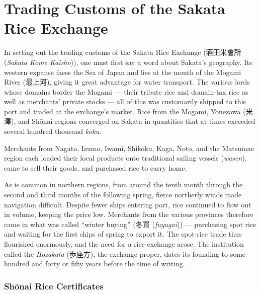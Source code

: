 \documentclass[10pt, openany]{book}
\newcommand{\jp}[1]{{\japanesefont #1}}
\newcommand{\jt}[2]{\jp{#1} (\textit{#2})}
\begin{document}
\chapter{Trading Customs of the Sakata Rice Exchange}

In setting out the trading customs of the Sakata Rice Exchange
(\jt{酒田米會所}{Sakata Kome Kaisho}), one must first say a word about
Sakata's geography. Its western expanse faces the Sea of Japan and lies
at the mouth of the Mogami River (\jp{最上河}), giving it great
advantage for water transport. The various lords whose domains border the
Mogami --- their tribute rice and domain-tax rice as well as merchants'
private stocks --- all of this was customarily shipped to this port and
traded at the exchange's market. Rice from the Mogami, Yonezawa
(\jp{米澤}), and Sh\=onai regions converged on Sakata in quantities
that at times exceeded several hundred thousand \textit{koku}.

Merchants from Nagato, Izumo, Iwami, Shikoku, Kaga, Noto, and the
Matsumae region each loaded their local products onto traditional sailing
vessels (\textit{wasen}), came to sell their goods, and purchased rice to
carry home.

As is common in northern regions, from around the tenth month through the
second and third months of the following spring, fierce northerly winds
made navigation difficult. Despite fewer ships entering port, rice
continued to flow out in volume, keeping the price low. Merchants from
the various provinces therefore came in what was called ``winter buying''
(\jt{冬買}{fuyugai}) --- purchasing spot rice and waiting for the first
ships of spring to export it. The spot-rice trade thus flourished
enormously, and the need for a rice exchange arose. The institution
called the \textit{Hozakata} (\jp{歩座方}), the exchange proper, dates
its founding to some hundred and forty or fifty years before the time of
writing.

\subsection*{Sh\=onai Rice Certificates}
\end{document}
